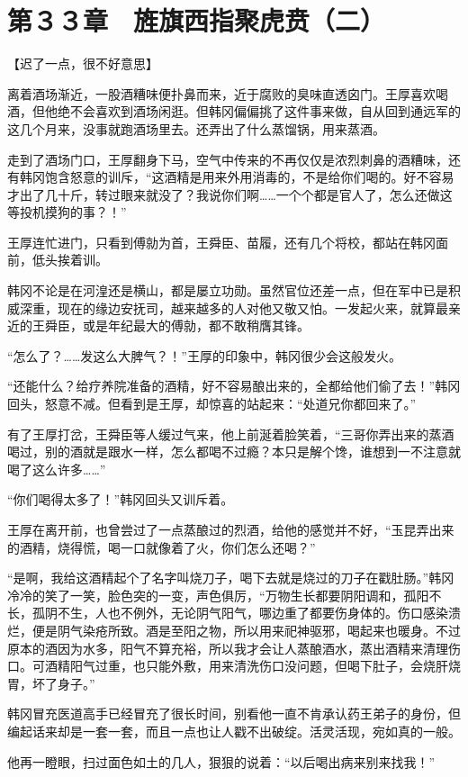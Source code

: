 \section{第３３章　旌旗西指聚虎贲（二）}

【迟了一点，很不好意思】

离着酒场渐近，一股酒糟味便扑鼻而来，近于腐败的臭味直透囟门。王厚喜欢喝酒，但他绝不会喜欢到酒场闲逛。但韩冈偏偏挑了这件事来做，自从回到通远军的这几个月来，没事就跑酒场里去。还弄出了什么蒸馏锅，用来蒸酒。

走到了酒场门口，王厚翻身下马，空气中传来的不再仅仅是浓烈刺鼻的酒糟味，还有韩冈饱含怒意的训斥，“这酒精是用来外用消毒的，不是给你们喝的。好不容易才出了几十斤，转过眼来就没了？我说你们啊……一个个都是官人了，怎么还做这等投机摸狗的事？！”

王厚连忙进门，只看到傅勍为首，王舜臣、苗履，还有几个将校，都站在韩冈面前，低头挨着训。

韩冈不论是在河湟还是横山，都是屡立功勋。虽然官位还差一点，但在军中已是积威深重，现在的缘边安抚司，越来越多的人对他又敬又怕。一发起火来，就算最亲近的王舜臣，或是年纪最大的傅勍，都不敢稍膺其锋。

“怎么了？……发这么大脾气？！”王厚的印象中，韩冈很少会这般发火。

“还能什么？给疗养院准备的酒精，好不容易酿出来的，全都给他们偷了去！”韩冈回头，怒意不减。但看到是王厚，却惊喜的站起来：“处道兄你都回来了。”

有了王厚打岔，王舜臣等人缓过气来，他上前涎着脸笑着，“三哥你弄出来的蒸酒喝过，别的酒就是跟水一样，怎么都喝不过瘾？本只是解个馋，谁想到一不注意就喝了这么许多……”

“你们喝得太多了！”韩冈回头又训斥着。

王厚在离开前，也曾尝过了一点蒸酿过的烈酒，给他的感觉并不好，“玉昆弄出来的酒精，烧得慌，喝一口就像着了火，你们怎么还喝？”

“是啊，我给这酒精起个了名字叫烧刀子，喝下去就是烧过的刀子在戳肚肠。”韩冈冷冷的笑了一笑，脸色突的一变，声色俱厉，“万物生长都要阴阳调和，孤阳不长，孤阴不生，人也不例外，无论阴气阳气，哪边重了都要伤身体的。伤口感染溃烂，便是阴气染疮所致。酒是至阳之物，所以用来祀神驱邪，喝起来也暖身。不过原本的酒因为水多，阳气不算充裕，所以我才会让人蒸酿酒水，蒸出酒精来清理伤口。可酒精阳气过重，也只能外敷，用来清洗伤口没问题，但喝下肚子，会烧肝烧胃，坏了身子。”

韩冈冒充医道高手已经冒充了很长时间，别看他一直不肯承认药王弟子的身份，但编起话来却是一套一套，而且一点也让人戳不出破绽。活灵活现，宛如真的一般。

他再一瞪眼，扫过面色如土的几人，狠狠的说着：“以后喝出病来别来找我！”


